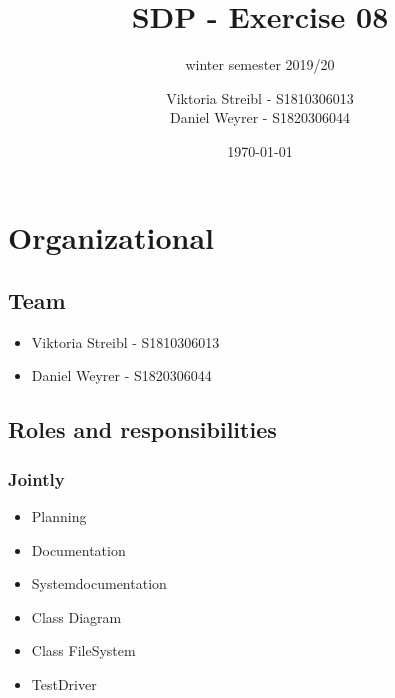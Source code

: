 
\graphicspath{{./}}



\title{SDP - Exercise 08} %
\subtitle{winter semester 2019/20} %
\author{
Viktoria Streibl - S1810306013\\
  Daniel Weyrer - S1820306044
} %
\date{\today} %

\maketitle %

\newpage
\tableofcontents %
\newpage


\section{Organizational}
\subsection{Team}
\begin{itemize}
	\item Viktoria 	Streibl 		- 	S1810306013
	\item Daniel 	Weyrer		-	S1820306044
\end{itemize}

\subsection{Roles and responsibilities}
\subsubsection{Jointly}
\begin{itemize}
	\item Planning
	\item Documentation
	\item Systemdocumentation
	\item Class Diagram
	\item Class FileSystem
	\item TestDriver
\end{itemize}

